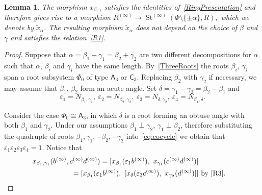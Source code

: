 \documentclass{article}
\numberwithin{equation}{section}
\newtheorem{lemma}{Lemma} \numberwithin{lemma}{section}
\theoremstyle{definition}
\theoremstyle{remark}
\DeclareMathOperator\St{St}
\newcommand{\rA}{\mathsf{A}}
\newcommand{\rC}{\mathsf{C}}
\begin{document}
\begin{lemma} The morphism $x_{\beta, \gamma}$ satisfies the identities of~\cref{RingPresentation} and therefore gives rise to a morphism
 $R^{(\infty)} \to \St^{(\infty)}(\Phi\setminus\{\pm\alpha\}, R),$ which we denote by $\widetilde{x}_\alpha$. The resulting morphism $\widetilde{x}_\alpha$ does not depend on the choice of $\beta$ and $\gamma$ and satisfies the relation~\eqref{R1}.
\end{lemma}
\begin{proof}
 Suppose that \(\alpha = \beta_1 + \gamma_1 = \beta_2 + \gamma_2\) are two different decompositions for $\alpha$ such that $\alpha$, $\beta_i$ and $\gamma_i$ have the same length.
 By~\cref{ThreeRoots} the roots $\beta_i$, $\gamma_i$ span a root subsystem $\Phi_0$ of type \(\rA_3\) or \(\rC_3\). 
 Replacing $\beta_2$ with $\gamma_2$ if necessary, we may assume that \(\beta_1\), \(\beta_2\) form an acute angle.
 Set $\delta = \gamma_1 - \gamma_2 = \beta_2 - \beta_1$ and
 \[\varepsilon_1 = N_{\beta_1, \gamma_1},\ \varepsilon_2 = N_{\beta_2, \gamma_2},\ \varepsilon_3 = N_{\delta,\gamma_2},\ \varepsilon_4 = N_{\beta_1, \delta}.\] 
 
 Consider the case \(\Phi_0 \cong \rA_3\), in which $\delta$ is a root forming an obtuse angle with both $\beta_1$ and $\gamma_2$. 
 Under our assumptions $\beta_1\perp \gamma_2$, $\gamma_1 \perp \beta_2$, therefore 
 substituting the quadruple of roots $\beta_1, \gamma_1, -\beta_2, -\gamma_2$ into~\eqref{eq:cocycle} we obtain that
 $\varepsilon_1 \varepsilon_2 \varepsilon_3 \varepsilon_4 = 1$.
 Notice that
 \begin{align}
 x_{\beta_1, \gamma_1}(b^{(\infty)}, c^{(\infty)} d^{(\infty)}) = [x_{\beta_1}(\varepsilon_1b^{(\infty)}),\ x_{\gamma_1}(c^{(\infty)}d^{(\infty)})] \label{eq:a3-start} \\ 
 = [x_{\beta_1}(\varepsilon_1b^{(\infty)}),\ [x_\delta(\varepsilon_3 c^{(\infty)}),\ x_{\gamma_2}(d^{(\infty)})]] & \text{ by~\eqref{R3}.} \nonumber
 \end{align}
 

\end{proof}
\end{document}
